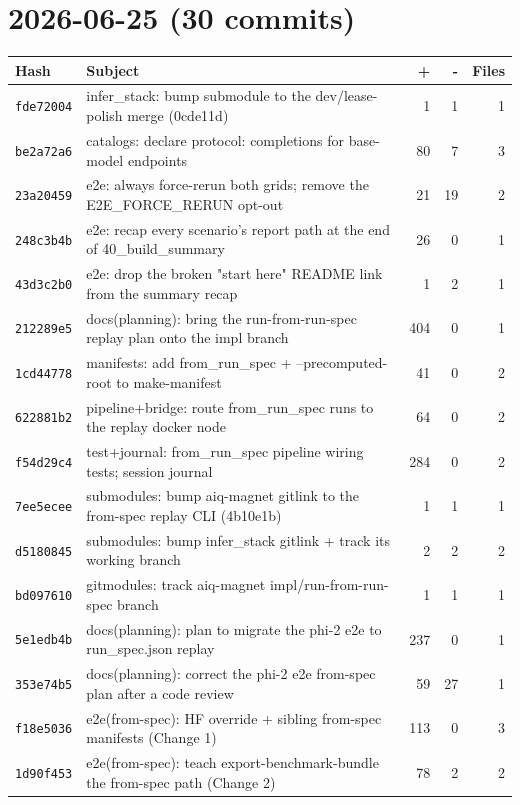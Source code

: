 \section*{2026-06-25 (30 commits)}
\begin{longtable}{@{}p{}p{}r r r@{}}
\toprule Hash & Subject & + & - & Files \\ \midrule\endhead
\texttt{fde72004} & infer\_stack: bump submodule to the dev/lease-polish merge (0cde11d) & 1 & 1 & 1 \\
\texttt{be2a72a6} & catalogs: declare protocol: completions for base-model endpoints & 80 & 7 & 3 \\
\texttt{23a20459} & e2e: always force-rerun both grids; remove the E2E\_FORCE\_RERUN opt-out & 21 & 19 & 2 \\
\texttt{248c3b4b} & e2e: recap every scenario's report path at the end of 40\_build\_summary & 26 & 0 & 1 \\
\texttt{43d3c2b0} & e2e: drop the broken "start here" README link from the summary recap & 1 & 2 & 1 \\
\texttt{212289e5} & docs(planning): bring the run-from-run-spec replay plan onto the impl branch & 404 & 0 & 1 \\
\texttt{1cd44778} & manifests: add from\_run\_spec + --precomputed-root to make-manifest & 41 & 0 & 2 \\
\texttt{622881b2} & pipeline+bridge: route from\_run\_spec runs to the replay docker node & 64 & 0 & 2 \\
\texttt{f54d29c4} & test+journal: from\_run\_spec pipeline wiring tests; session journal & 284 & 0 & 2 \\
\texttt{7ee5ecee} & submodules: bump aiq-magnet gitlink to the from-spec replay CLI (4b10e1b) & 1 & 1 & 1 \\
\texttt{d5180845} & submodules: bump infer\_stack gitlink + track its working branch & 2 & 2 & 2 \\
\texttt{bd097610} & gitmodules: track aiq-magnet impl/run-from-run-spec branch & 1 & 1 & 1 \\
\texttt{5e1edb4b} & docs(planning): plan to migrate the phi-2 e2e to run\_spec.json replay & 237 & 0 & 1 \\
\texttt{353e74b5} & docs(planning): correct the phi-2 e2e from-spec plan after a code review & 59 & 27 & 1 \\
\texttt{f18e5036} & e2e(from-spec): HF override + sibling from-spec manifests (Change 1) & 113 & 0 & 3 \\
\texttt{1d90f453} & e2e(from-spec): teach export-benchmark-bundle the from-spec path (Change 2) & 78 & 2 & 2 \\

\end{longtable}
